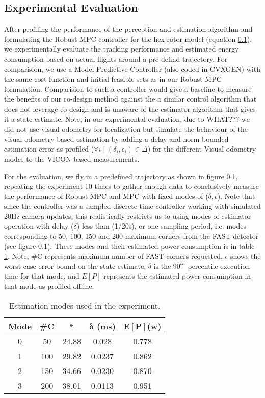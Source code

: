 \subsection{Experimental Evaluation}

After profiling the performance of the perception and estimation algorithm and formulating the Robust MPC controller for the hex-rotor model (equation \ref{}), we experimentally evaluate the tracking performance and estimated energy consumption based on actual flights around a pre-defind trajectory. For comparision, we use a Model Predictive Controller (also coded in CVXGEN) with the same cost function and initial feasible sets as in our Robust MPC formulation. Comparision to such a controller would give a baseline to measure the benefits of our co-design method against the a similar control algorithm that does not leverage co-design and is unaware of the estimator algorithm that gives it a state estimate. Note, in our experimental evaluation, due to WHAT??? we did not use visual odometry for localization but simulate the behaviour of the visual odometry based estimation by adding a delay and norm bounded estimation error as profiled ($\forall i \mid (\delta_i,\epsilon_i) \in \Delta $) for the different Visual odometry modes to the VICON based measurements. 

For the evaluation, we fly in a predefined trajectory as shown in figure \ref{}, repeating the experiment 10 times to gather enough data to conclusively measure the performance of Robust MPC and MPC with fixed modes of ($\delta,\epsilon$). Note that since the controller was a sampled discrete-time controller working with simulated 20Hz camera updates, this realistically restricts us to using modes of estimator operation with delay ($\delta$) less than (1/20s), or one sampling period, i.e. modes corresponding to 50, 100, 150 and 200 maximum corners from the FAST detector (see figure \ref{}). These modes and their estimated power consumption is in table \ref{tbl:modes_exp}. Note, \#C represents maximum number of FAST corners requested, $\epsilon$ shows the worst case error bound on the state estimate, $\delta$ is the $90^{th}$ percentile execution time for that mode, and $E[P]$ represents the estimated power consumption in that mode as profiled offline.

\begin{table}[htb]
\label{tbl:modes_exp}
\begin{center}
\caption{Estimation modes used in the experiment.}
\begin{tabular} {|c|c|c|c|c|}
	\hline
	\textbf{Mode} & \textbf{\#C} & $\pmb{\epsilon}$ & $\pmb{\delta}$ \textbf{(ms)} & $\pmb{E[P]}$\textbf{(w)} \\ \hline
	0 & 50 &  24.88 & 0.028 &  0.778  \\ \hline
 	1 & 100 & 29.82 & 0.0237 &  0.862  \\ \hline
	2 & 150 & 34.66 & 0.0230 & 0.870 \\ \hline
	3 & 200 & 38.01 & 0.0113 & 0.951 \\ \hline
	\end{tabular}	
	\end{center}
\end{table}


